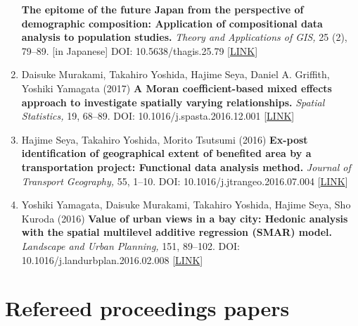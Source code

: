 \documentclass[
]{book}
\begin{document}
\begin{enumerate}
  \textbf{The epitome of the future Japan from the perspective of demographic composition: Application of compositional data analysis to population studies.}
  \emph{Theory and Applications of GIS,} 25 (2), 79--89. {[}in Japanese{]}
  DOI: 10.5638/thagis.25.79 {[}\href{https://www.jstage.jst.go.jp/article/thagis/25/2/25_79/_article/-char/en}{LINK}{]}
\item
  Daisuke Murakami, Takahiro Yoshida, Hajime Seya, Daniel A. Griffith, Yoshiki Yamagata (2017)
  \textbf{A Moran coefficient-based mixed effects approach to investigate spatially varying relationships.}
  \emph{Spatial Statistics,} 19, 68--89.
  DOI: 10.1016/j.spasta.2016.12.001 {[}\href{http://www.sciencedirect.com/science/article/pii/S2211675316301798}{LINK}{]}
\item
  Hajime Seya, Takahiro Yoshida, Morito Tsutsumi (2016)
  \textbf{Ex-post identification of geographical extent of benefited area by a transportation project: Functional data analysis method.}
  \emph{Journal of Transport Geography,} 55, 1--10.
  DOI: 10.1016/j.jtrangeo.2016.07.004 {[}\href{http://www.sciencedirect.com/science/article/pii/S0966692316303763}{LINK}{]}
\item
  Yoshiki Yamagata, Daisuke Murakami, Takahiro Yoshida, Hajime Seya, Sho Kuroda (2016)
  \textbf{Value of urban views in a bay city: Hedonic analysis with the spatial multilevel additive regression (SMAR) model.}
  \emph{Landscape and Urban Planning,} 151, 89--102.
  DOI: 10.1016/j.landurbplan.2016.02.008 {[}\href{http://www.sciencedirect.com/science/article/pii/S0169204616000232}{LINK}{]}
\end{enumerate}

\section*{Refereed proceedings papers}\label{refereed-proceedings-papers}
\end{document}
